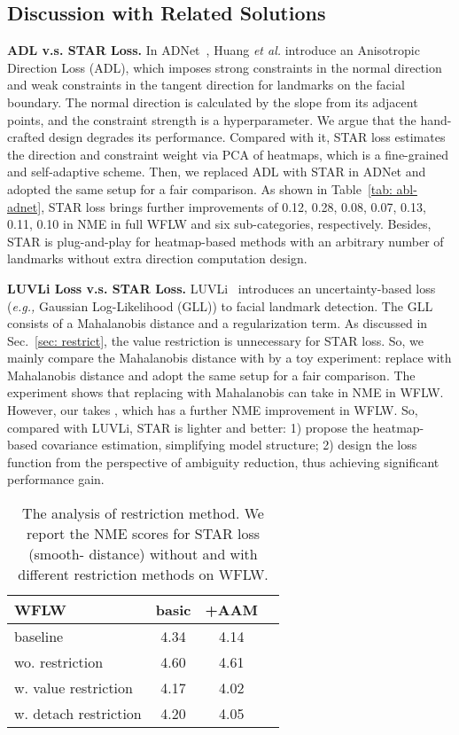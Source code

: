 \documentclass[10pt,twocolumn,letterpaper]{article}
\begin{document}
\subsection{Discussion with Related Solutions}

\noindent\textbf{ADL v.s. STAR Loss.}
In ADNet~\cite{huang2021adnet}, Huang \emph{et al.} introduce an Anisotropic Direction Loss (ADL), which imposes strong constraints in the normal direction and weak constraints in the tangent direction for landmarks on the facial boundary.
The normal direction is calculated by the slope from its adjacent points, and the constraint strength is a hyperparameter.
We argue that the hand-crafted design degrades its performance.
Compared with it, STAR loss estimates the direction and constraint weight via PCA of heatmaps, which is a fine-grained and self-adaptive scheme.
Then, we replaced ADL with STAR in ADNet and adopted the same setup for a fair comparison.
As shown in Table~\ref{tab: abl-adnet}, STAR loss brings further improvements of 0.12, 0.28, 0.08, 0.07, 0.13, 0.11, 0.10 in NME in full WFLW and six sub-categories, respectively.
Besides, STAR is plug-and-play for heatmap-based methods with an arbitrary number of landmarks without extra direction computation design.

\noindent\textbf{LUVLi Loss v.s. STAR Loss.}
\label{sec: gll}
LUVLi~\cite{kumar2020luvli} introduces an uncertainty-based loss (\emph{e.g.,} Gaussian Log-Likelihood (GLL)) to facial landmark detection.
The GLL consists of a Mahalanobis distance and a regularization term.
As discussed in Sec.~\ref{sec: restrict}, the value restriction is unnecessary for STAR loss.
So, we mainly compare the Mahalanobis distance with  by a toy experiment: replace  with Mahalanobis distance and adopt the same setup for a fair comparison.
The experiment shows that replacing  with Mahalanobis can take  in NME in WFLW.
However, our  takes , which has a further  NME improvement in WFLW.
So, compared with LUVLi, STAR is lighter and better: 1) propose the heatmap-based covariance estimation, simplifying model structure; 2) design the loss function from the perspective of ambiguity reduction, thus achieving significant performance gain.


\begin{table}[t]
\centering
\begin{tabular}{l|ccc}
WFLW                      & basic & +AAM \\
\hline
baseline                  & 4.34  & 4.14 \\
\hline
wo. restriction       & 4.60 & 4.61 \\
w. value restriction  & 4.17 & 4.02 \\
w. detach restriction & 4.20 & 4.05 \\
\end{tabular}\vspace{-0.5em}
\caption{The analysis of restriction method. We report the NME scores for STAR loss (smooth- distance) without and with different restriction methods on WFLW.} 
\vspace{-0.5em}
\label{tab: abl-restrict}
\end{table}
\end{document}
